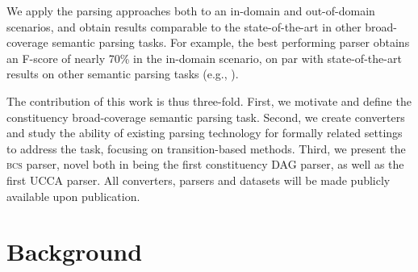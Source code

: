 \documentclass[11pt]{article}
\newcommand{\secref}[1]{Section~\ref{#1}}
\begin{document}
We apply the parsing approaches both to an in-domain and out-of-domain scenarios,
and obtain results comparable to the state-of-the-art in other broad-coverage semantic parsing
tasks. For example, the best performing parser obtains an F-score of nearly 70\% in
the in-domain scenario, on par with state-of-the-art results on other semantic
parsing tasks (e.g., \cite{artzi2015broad}). 


The contribution of this work is thus three-fold.
First, we motivate and define the constituency broad-coverage semantic parsing task.
Second, we create converters and study the ability of existing parsing technology
for formally related settings to address the task, focusing on transition-based methods.
Third, we present the \textsc{bcs} parser, novel both in being the first constituency DAG parser, as well as the first UCCA parser. 
All converters, parsers and datasets will be made publicly available upon publication.

\section{Background}\label{sec:related}
\end{document}
